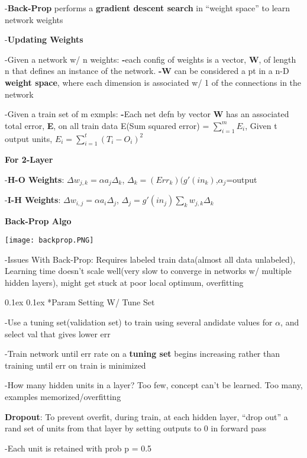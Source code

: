\documentclass[10pt,landscape]{article}
\makeatletter
\renewcommand{\subsection}{\@startsection{subsection}{2}{0mm}%
                                {0.1ex}%
                                {0.1ex}%
                                {\normalfont\footnotesize\bfseries}}
\makeatother
\begin{document}
\begin{multicols}{3}
-\textbf{Back-Prop} performs a \textbf{gradient descent search} in ``weight space'' to learn network weights

-\textbf{Updating Weights}

-Given a network w/ n weights: \textbf{-}each config of weights is a vector, \textbf{W}, of length n that defines an instance of the network. \textbf{-W} can be considered a pt in a n-D \textbf{weight space}, where each dimension is associated w/ 1 of the connections in the network

-Given a train set of m exmpls: \textbf{-}Each net defn by vector \textbf{W} has an associated total error, \textbf{E}, on all train data E(Sum squared error) = $\sum_{i=1}^{m} E_i$, Given t output units, $E_i = \sum_{i=1}^{t} (T_i - O_i)^2$ 

\textbf{For 2-Layer}

-\textbf{H-O Weights}: $\Delta w_{j,k} = \alpha a_j \Delta_k$, $\Delta_k=(Err_k)(g'(in_k)$,$\alpha_j$=output 

-\textbf{I-H Weights}: $\Delta w_{i,j} = \alpha a_i \Delta_j$, $\Delta_j=g'(in_j)\sum_{k}w_{j,k}\Delta_k$

\textbf{Back-Prop Algo}

\texttt{[image: backprop.PNG]}

{\scriptsize
-Issues With Back-Prop: Requires labeled train data(almost all data unlabeled), Learning time doesn't scale well(very slow to converge in networks w/ multiple hidden layers), might get stuck at poor local optimum, overfitting
}

\subsection{*Param Setting W/ Tune Set}

-Use a tuning set(validation set) to train using several andidate values for $\alpha$, and select val that gives lower err

-Train network until err rate on a \textbf{tuning set} begins increasing rather than training until err on train is minimized

-How many hidden units in a layer? Too few, concept can't be learned. Too many, examples memorized/overfitting

\textbf{Dropout}: To prevent overfit, during train, at each hidden layer, ``drop out'' a rand set of units from that layer by setting outputs to 0 in forward pass

-Each unit is retained with prob p = 0.5


\end{multicols}
\end{document}
